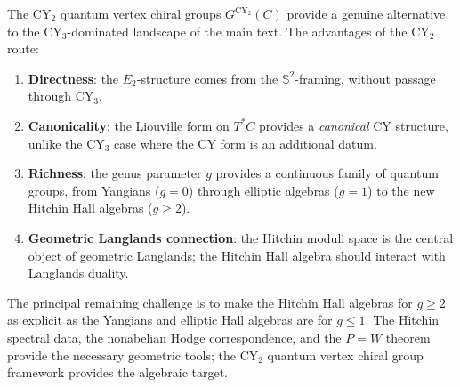 \documentclass[11pt]{article}
\theoremstyle{garamondthm}
\theoremstyle{garamonddef}
\theoremstyle{garamondrem}
\newcommand{\CY}{\mathrm{CY}}
\newcommand{\Etwo}{E_2}
\begin{document}
The $\CY_2$ quantum vertex chiral groups $G^{\CY_2}(C)$ provide a genuine alternative to the $\CY_3$-dominated landscape of the main text. The advantages of the $\CY_2$ route:

\begin{enumerate}[label=(\arabic*)]
 \item \textbf{Directness}: the $\Etwo$-structure comes from the $\mathbb{S}^2$-framing, without passage through $\CY_3$.
 \item \textbf{Canonicality}: the Liouville form on $T^*C$ provides a \emph{canonical} CY structure, unlike the $\CY_3$ case where the CY form is an additional datum.
 \item \textbf{Richness}: the genus parameter $g$ provides a continuous family of quantum groups, from Yangians ($g = 0$) through elliptic algebras ($g = 1$) to the new Hitchin Hall algebras ($g \geq 2$).
 \item \textbf{Geometric Langlands connection}: the Hitchin moduli space is the central object of geometric Langlands; the Hitchin Hall algebra should interact with Langlands duality.
\end{enumerate}

The principal remaining challenge is to make the Hitchin Hall algebras for $g \geq 2$ as explicit as the Yangians and elliptic Hall algebras are for $g \leq 1$. The Hitchin spectral data, the nonabelian Hodge correspondence, and the $P = W$ theorem provide the necessary geometric tools; the $\CY_2$ quantum vertex chiral group framework provides the algebraic target.
\end{document}
